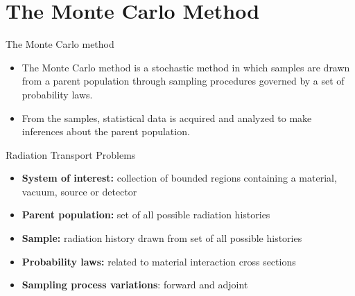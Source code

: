 \documentclass{beamer}
\begin{document}
\section{The Monte Carlo Method}
\begin{frame}{The Monte Carlo method}

  \begin{itemize}
    \item The Monte Carlo method is a stochastic method in which samples are
      drawn from a parent population through sampling procedures governed by
      a set of probability laws.
    \item From the samples, statistical data is acquired and analyzed to make
      inferences about the parent population.
  \end{itemize}
  
  \medskip
  \medskip
  
  \begin{beamerboxesrounded}{Radiation Transport Problems}
    \begin{itemize}
      \item \textbf{System of interest:} collection of bounded regions 
        containing a material, vacuum, source or detector
      \item \textbf{Parent population:} set of all possible radiation histories
      \item \textbf{Sample:} radiation history drawn from set of all possible 
        histories
      \item \textbf{Probability laws:} related to material interaction cross 
        sections
      \item \textbf{Sampling process variations}: forward and adjoint
    \end{itemize}
  \end{beamerboxesrounded}
    
\end{frame}
\end{document}
